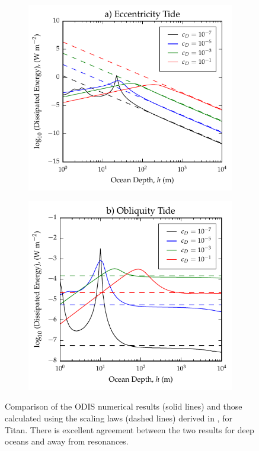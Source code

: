 \begin{figure}[!t]
\centering
\begin{subfigure}{0.4\linewidth}
\centering
\includegraphics[width=\linewidth]{Figures/Eccentricity_scaling}
\subcaption{\label{fig:scalEccTitan}}
\end{subfigure}%
\begin{subfigure}{0.4\linewidth}
\centering
\includegraphics[width=\linewidth]{Figures/Obliquity_scaling}
\subcaption{\label{fig:scalObliqTitan}}
\end{subfigure}
\vspace*{-0.8cm}
\caption{Comparison of the ODIS numerical results (solid lines) and those calculated using the scaling laws (dashed lines) derived in \citet{chen2013tidal}, for Titan. There is excellent agreement between the two results for deep oceans and away from resonances. \label{fig:scalTitan}}
\end{figure}

